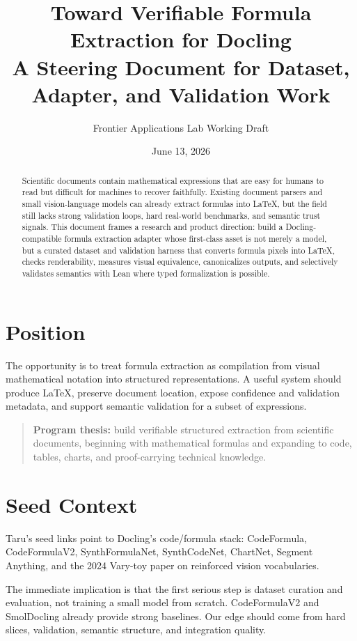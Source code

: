 \documentclass[11pt]{article}
\title{\textbf{Toward Verifiable Formula Extraction for Docling}\\
\large A Steering Document for Dataset, Adapter, and Validation Work}
\author{Frontier Applications Lab Working Draft}
\date{June 13, 2026}
\begin{document}
\maketitle

\begin{abstract}
Scientific documents contain mathematical expressions that are easy for humans to read but difficult for machines to recover faithfully. Existing document parsers and small vision-language models can already extract formulas into \LaTeX, but the field still lacks strong validation loops, hard real-world benchmarks, and semantic trust signals. This document frames a research and product direction: build a Docling-compatible formula extraction adapter whose first-class asset is not merely a model, but a curated dataset and validation harness that converts formula pixels into \LaTeX, checks renderability, measures visual equivalence, canonicalizes outputs, and selectively validates semantics with Lean where typed formalization is possible.
\end{abstract}

\section{Position}

The opportunity is to treat formula extraction as compilation from visual mathematical notation into structured representations. A useful system should produce \LaTeX, preserve document location, expose confidence and validation metadata, and support semantic validation for a subset of expressions.

\begin{quote}
\textbf{Program thesis:} build verifiable structured extraction from scientific documents, beginning with mathematical formulas and expanding to code, tables, charts, and proof-carrying technical knowledge.
\end{quote}

\section{Seed Context}

Taru's seed links point to Docling's code/formula stack: CodeFormula, CodeFormulaV2, SynthFormulaNet, SynthCodeNet, ChartNet, Segment Anything, and the 2024 Vary-toy paper on reinforced vision vocabularies.

The immediate implication is that the first serious step is dataset curation and evaluation, not training a small model from scratch. CodeFormulaV2 and SmolDocling already provide strong baselines. Our edge should come from hard slices, validation, semantic structure, and integration quality.
\end{document}

